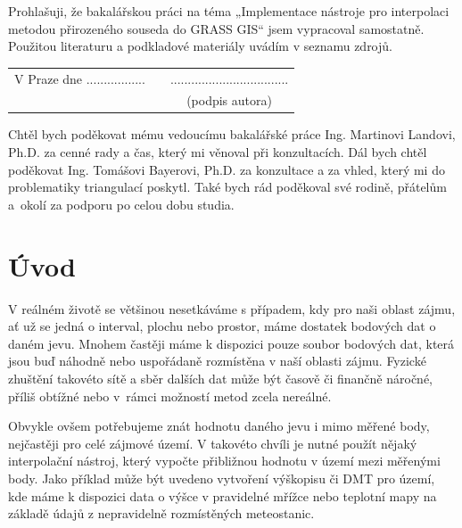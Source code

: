\documentclass[12pt,a4paper]{article}
\newcommand{\necislovana}[1]{%
\phantomsection
\addcontentsline{toc}{section}{#1}



\section*{#1}
\markboth{\uppercase{#1}}{}
}
\begin{document}
\newcommand{\odsaditodzhora}{\hskip1pt\vfill}
\newpage
\odsaditodzhora
{}

Prohlašuji, že bakalářskou práci na téma „Implementace nástroje pro
interpolaci metodou přirozeného souseda do GRASS GIS“ jsem vypracoval
samostatně. Pou\-žitou literaturu a podkladové materiály uvádím v
seznamu zdrojů.


\begin{flushleft}
\begin{tabular}{cp{}c}
V Praze dne .................
& 
&
..................................
\\
&&
(podpis autora)
\end{tabular}

\end{flushleft}
\newpage

\odsaditodzhora
{}

Chtěl bych poděkovat mému vedoucímu bakalářské práce Ing. Martinovi
Landovi, Ph.D. za cenné rady a čas, který mi věnoval při
konzultacích. Dál bych chtěl poděkovat Ing. Tomášovi Bayerovi, Ph.D. za konzultace a za vhled, 
který mi do problematiky triangulací poskytl. Také bych rád poděkoval své rodině, přátelům 
a~okolí za podporu po celou dobu studia.

\newpage
\tableofcontents

\newpage
\pagestyle{fancy}

\necislovana{Úvod} 

V reálném životě se většinou nesetkáváme s
případem, kdy pro naši oblast zájmu, ať už se jedná o interval, plochu
nebo prostor, máme dostatek bodových dat o daném jevu. Mnohem častěji
máme k dispozici pouze soubor bodových dat, která jsou buď náhodně
nebo uspořádaně rozmístěna v naší oblasti zájmu. Fyzické zhuštění
takovéto sítě a sběr dalších dat může být časově či finančně náročné,
příliš obtížné nebo v~rámci možností metod zcela nereálné.

Obvykle ovšem potřebujeme znát hodnotu daného jevu i mimo měřené body,
nejčastěji pro celé zájmové území. V takovéto chvíli je nutné použít
nějaký interpolační nástroj, který vypočte přibližnou hodnotu v území
mezi měřenými body. Jako příklad může být uvedeno vytvoření výškopisu
či DMT pro území, kde máme k dispozici data o výšce v pravidelné
mřížce nebo teplotní mapy na základě údajů z nepravidelně rozmístěných
meteostanic.
\end{document}
